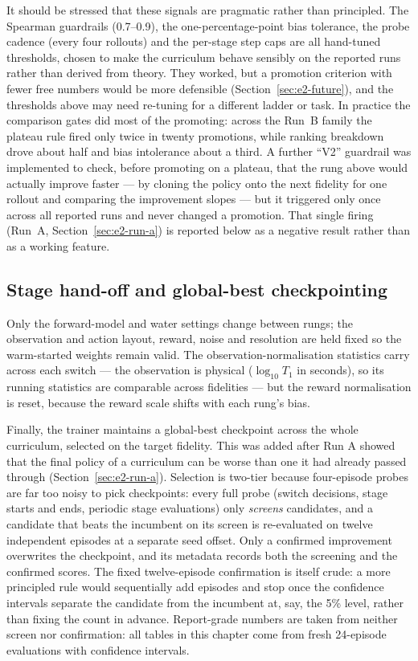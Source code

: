 It should be stressed that these signals are pragmatic rather than principled.
The Spearman guardrails (0.7--0.9), the one-percentage-point bias tolerance, the
probe cadence (every four rollouts) and the per-stage step caps are all
hand-tuned thresholds, chosen to make the curriculum behave sensibly on the
reported runs rather than derived from theory. They worked, but a promotion
criterion with fewer free numbers would be more defensible
(Section~\ref{sec:e2-future}), and the thresholds above may need re-tuning for
a different ladder or task. In practice the comparison gates did most of the
promoting: across the Run~B family the plateau rule fired only twice in twenty
promotions, while ranking breakdown drove about half and bias intolerance about
a third. A further ``V2'' guardrail was implemented to check, before promoting
on a plateau, that the rung above would actually improve faster --- by cloning
the policy onto the next fidelity for one rollout and comparing the improvement
slopes --- but it triggered only once across all reported runs and never changed
a promotion. That single firing (Run~A, Section~\ref{sec:e2-run-a}) is reported
below as a negative result rather than as a working feature.

\subsection{Stage hand-off and global-best checkpointing}
\label{sec:e2-mf-handoff}

Only the forward-model and water settings change between rungs; the
observation and action layout, reward, noise and resolution are held fixed so
the warm-started weights remain valid. The observation-normalisation
statistics carry across each switch --- the observation is physical
($\log_{10} T_1$ in seconds), so its running statistics are comparable across
fidelities --- but the reward normalisation is reset, because the reward
scale shifts with each rung's bias.

Finally, the trainer maintains a global-best checkpoint across the whole
curriculum, selected on the target fidelity. This was added after Run A
showed that the final policy of a curriculum can be worse than one it had
already passed through (Section~\ref{sec:e2-run-a}). Selection is two-tier
because four-episode probes are far too noisy to pick checkpoints: every full
probe (switch decisions, stage starts and ends, periodic stage evaluations)
only \emph{screens} candidates, and a candidate that beats the incumbent on
its screen is re-evaluated on twelve independent episodes at a separate seed
offset. Only a confirmed improvement overwrites the checkpoint, and its
metadata records both the screening and the confirmed scores. The fixed
twelve-episode confirmation is itself crude: a more principled rule would
sequentially add episodes and stop once the confidence intervals separate the
candidate from the incumbent at, say, the 5\% level, rather than fixing the
count in advance. Report-grade numbers are taken from neither screen nor
confirmation: all tables in this chapter come from fresh 24-episode evaluations
with confidence intervals.

